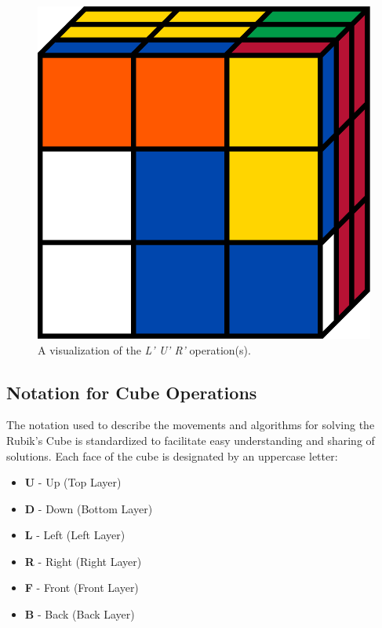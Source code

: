 \documentclass[12pt]{article}
\begin{document}
\begin{figure}[h]
\begin{minipage}[c]{0.2\textwidth}
    \end{minipage}
    \begin{minipage}[c]{0.05\textwidth}
        \centering
    \end{minipage}
    \hspace{0.5cm}
    \begin{minipage}[c]{0.2\textwidth}
        \includegraphics[scale=0.1]{moves/cubeLpUpRp.png}
    \end{minipage}
    \caption{A visualization of the \textit{L' U' R'} operation(s).}
\end{figure}

\subsection{Notation for Cube Operations}

The notation used to describe the movements and algorithms for solving the Rubik's Cube is standardized to facilitate easy understanding and sharing of solutions. Each face of the cube is designated by an uppercase letter:

\begin{itemize}
    \item \textbf{U} - Up (Top Layer)
    \item \textbf{D} - Down (Bottom Layer)
    \item \textbf{L} - Left (Left Layer)
    \item \textbf{R} - Right (Right Layer)
    \item \textbf{F} - Front (Front Layer)
    \item \textbf{B} - Back (Back Layer)
\end{itemize}
\end{document}
